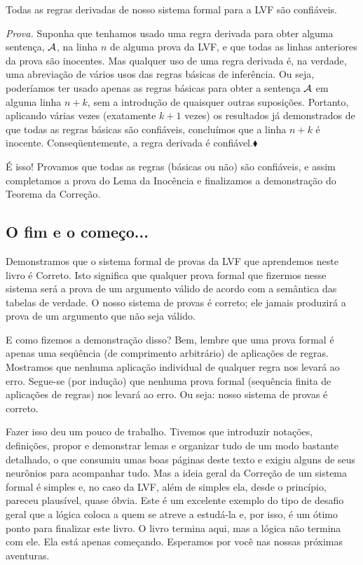 \begin{factoidboxe}
	Todas as regras derivadas de nosso sistema formal para a LVF são confiáveis.
\end{factoidboxe}
\noindent\emph{Prova.}
	Suponha que tenhamos usado uma regra derivada para obter alguma sentença, $\mathcal{A}$, na linha $n$ de alguma prova da LVF, e que todas as linhas anteriores da prova são inocentes.
	Mas qualquer uso de uma regra derivada é, na verdade, uma abreviação de vários usos das regras básicas de inferência.
	Ou seja, poderíamos ter usado apenas as regras básicas para obter a sentença $\mathcal{A}$ em alguma linha $n+k$, sem a introdução de quaisquer outras suposições.
	Portanto, aplicando várias vezes (exatamente $k+1$ vezes) os resultados já demonstrados de que todas as regras básicas são confiáveis, concluímos que a linha $n+k$ é inocente. Conseqüentemente, a regra derivada é confiável.$\blacklozenge$

É isso! Provamos que todas as regras (básicas ou não) são confiáveis, e assim completamos a prova do Lema da Inocência e finalizamos a demonstração do Teorema da Correção.


\subsection{O fim e o começo...}
Demonstramos que o sistema formal de provas da LVF que aprendemos neste livro é Correto. Isto significa que qualquer prova formal que fizermos nesse sistema será a prova de um argumento válido de acordo com a semântica das tabelas de verdade.
O nosso sistema de provas é correto; ele jamais produzirá a prova de um argumento que não seja válido.

E como fizemos a demonstração disso? Bem, lembre que uma prova formal é apenas uma seqüência (de comprimento arbitrário) de aplicações de regras.
Mostramos que nenhuma aplicação individual de qualquer regra nos levará ao erro. Segue-se (por indução) que nenhuma prova formal (sequência finita de aplicações de regras) nos levará ao erro. Ou seja: nosso sistema de provas é correto.

Fazer isso deu um pouco de trabalho.
Tivemos que introduzir notações, definições, propor e demonstrar lemas e organizar tudo de um modo bastante detalhado, o que consumiu umas boas páginas deste texto e exigiu alguns de seus neurônios para acompanhar tudo.
Mas a ideia geral da Correção de um sistema formal é simples e, no caso da LVF, além de simples ela, desde o princípio, pareceu plausível, quase óbvia.
Este é um excelente exemplo do tipo de desafio geral que a lógica coloca a quem se atreve a estudá-la e, por isso, é um ótimo ponto para finalizar este livro.
O livro termina aqui, mas a lógica não termina com ele. Ela está apenas começando. Esperamos por você nas nossas próximas aventuras. 



